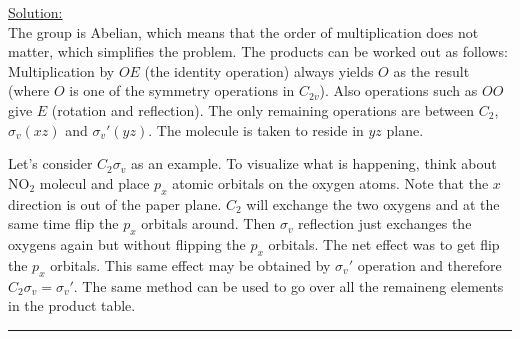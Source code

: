 \noindent
\underline{Solution:}\\

\noindent
The group is Abelian, which means that the order of multiplication does not matter, which simplifies the problem. The products can be worked out as follows:\\

\noindent
Multiplication by $OE$ (the identity operation) always yields $O$ as the result (where $O$ is one of the symmetry operations in $C_{2v}$).
Also operations such as $OO$ give $E$ (rotation and reflection). The only remaining operations are between $C_2$, $\sigma_v(xz)$ and $\sigma_v'(yz)$.
The molecule is taken to reside in $yz$ plane. 

\noindent
Let's consider $C_2\sigma_v$ as an example. To visualize what is happening, think about NO$_2$ molecul and place $p_x$ atomic orbitals on the oxygen
atoms. Note that the $x$ direction is out of the paper plane. $C_2$ will exchange the two oxygens and at the same time flip the $p_x$ orbitals around.
Then $\sigma_v$ reflection just exchanges the oxygens again but without flipping the $p_x$ orbitals. The net effect was to get flip the $p_x$ orbitals.
This same effect may be obtained by $\sigma_v'$ operation and therefore $C_2\sigma_v = \sigma_v'$. The same method can be used to go over all
the remaineng elements in the product table.\\

\hrule\vspace{0.5cm}



